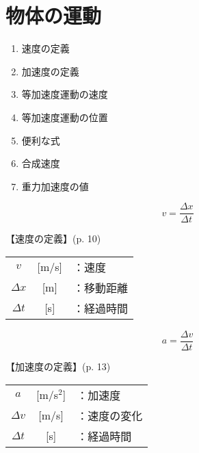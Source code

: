 \documentclass[10pt]{jarticle}
\begin{document}
\addtocounter{page}{-1}
\thispagestyle{empty}
\tableofcontents



\newpage
\addtocounter{page}{-1}
\thispagestyle{empty}
\section{物体の運動}


\begin{enumerate}
\small
\itemsep-4mm
\item 速度の定義\\
\item 加速度の定義\\
\item 等加速度運動の速度\\
\item 等加速度運動の位置\\
\item 便利な式\\
\item 合成速度\\
\item 重力加速度の値
\end{enumerate}


\newpage
\[
	v = \frac{\mathit{\Delta} x}{\mathit{\Delta} t}
\]


\vskip3mm
【速度の定義】{\footnotesize (p. 10)}

\begin{tabular}{ccl}
$v$	&[m/s]	&：速度\\
$\mathit{\Delta} x$	&[m]	&：移動距離\\
$\mathit{\Delta} t$	&[s]	&：経過時間
\end{tabular}



\newpage
\[
	a = \frac{\mathit{\Delta} v}{\mathit{\Delta} t}
\]


\vskip3mm
【加速度の定義】{\footnotesize (p. 13)}

\begin{tabular}{ccl}
$a$	&[m/s$^2$]	&：加速度\\
$\mathit{\Delta} v$	&[m/s]	&：速度の変化\\
$\mathit{\Delta} t$	&[s]	&：経過時間
\end{tabular}
\end{document}
